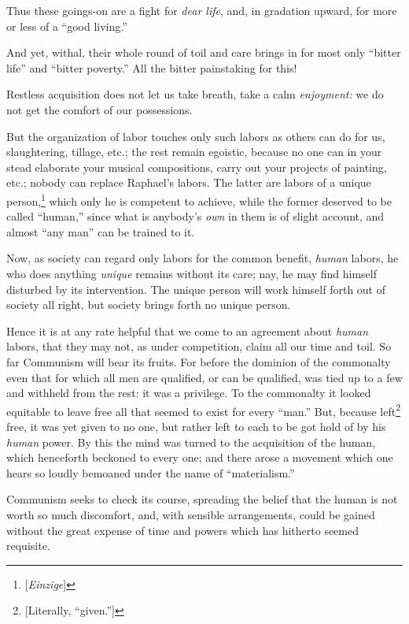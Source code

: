 \documentclass[12pt,a4paper]{book}
\begin{document}
Thus these goings-on are a fight for \textit{dear life}, and, in gradation 
upward, for more or less of a ``good living.''

And yet, withal, their whole round of toil and care brings in for most only 
``bitter life'' and ``bitter poverty.'' All the bitter painstaking for 
this!

Restless acquisition does not let us take breath, take a calm 
\textit{enjoyment:} we do not get the comfort of our possessions.

But the organization of labor touches only such labors as others can do for 
us, slaughtering, tillage, etc.; the rest remain egoistic, because no one can 
in your stead elaborate your musical compositions, carry out your projects of 
painting, etc.; nobody can replace Raphael's labors. The latter are labors of 
a unique person,\footnote{[\textit{Einzige}]} which only he is competent to 
achieve, while the former deserved to be called ``human,'' since what is 
anybody's \textit{own} in them is of slight account, and almost ``any man'' 
can be trained to it.

Now, as society can regard only labors for the common benefit, \textit{human} 
labors, he who does anything \textit{unique} remains without its care; nay, he 
may find himself disturbed by its intervention. The unique person will work 
himself forth out of society all right, but society brings forth no unique 
person.

Hence it is at any rate helpful that we come to an agreement about 
\textit{human} labors, that they may not, as under competition, claim all our 
time and toil. So far Communism will bear its fruits. For before the dominion 
of the commonalty even that for which all men are qualified, or can be 
qualified, was tied up to a few and withheld from the rest: it was a 
privilege. To the commonalty it looked equitable to leave free all that seemed 
to exist for every ``man.'' But, because left\footnote{[Literally, 
``given.'']} free, it was yet given to no one, but rather left to each to be 
got hold of by his \textit{human} power. By this the mind was turned to the 
acquisition of the human, which henceforth beckoned to every one; and there 
arose a movement which one hears so loudly bemoaned under the name of 
``materialism.''

Communism seeks to check its course, spreading the belief that the human is 
not worth so much discomfort, and, with sensible arrangements, could be gained 
without the great expense of time and powers which has hitherto seemed 
requisite.
\end{document}
